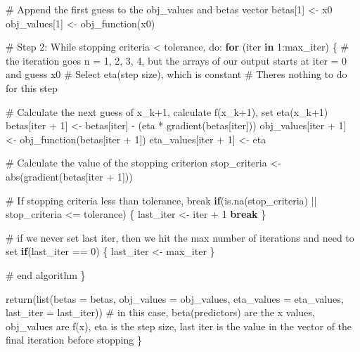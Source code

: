 \documentclass[
  letterpaper,
  DIV=11,
  numbers=noendperiod]{scrartcl}
\newenvironment{Shaded}{\begin{snugshade}}{\end{snugshade}}
\newcommand{\AttributeTok}[1]{\textcolor[rgb]{0.40,0.45,0.13}{#1}}
\newcommand{\CommentTok}[1]{\textcolor[rgb]{0.37,0.37,0.37}{#1}}
\newcommand{\ControlFlowTok}[1]{\textcolor[rgb]{0.00,0.23,0.31}{\textbf{#1}}}
\newcommand{\DecValTok}[1]{\textcolor[rgb]{0.68,0.00,0.00}{#1}}
\newcommand{\FunctionTok}[1]{\textcolor[rgb]{0.28,0.35,0.67}{#1}}
\newcommand{\NormalTok}[1]{\textcolor[rgb]{0.00,0.23,0.31}{#1}}
\newcommand{\OtherTok}[1]{\textcolor[rgb]{0.00,0.23,0.31}{#1}}
\newcommand{\SpecialCharTok}[1]{\textcolor[rgb]{0.37,0.37,0.37}{#1}}
\begin{document}
\begin{Shaded}
\begin{Highlighting}[]
  \CommentTok{\# Append the first guess to the obj\_values and betas vector}
\NormalTok{  betas[}\DecValTok{1}\NormalTok{] }\OtherTok{\textless{}{-}}\NormalTok{ x0}
\NormalTok{  obj\_values[}\DecValTok{1}\NormalTok{] }\OtherTok{\textless{}{-}} \FunctionTok{obj\_function}\NormalTok{(x0)}
  
  \CommentTok{\# Step 2: While stopping criteria \textless{} tolerance, do:}
  \ControlFlowTok{for}\NormalTok{ (iter }\ControlFlowTok{in} \DecValTok{1}\SpecialCharTok{:}\NormalTok{max\_iter) \{ }\CommentTok{\# the iteration goes n = 1, 2, 3, 4, but the arrays of our output starts at iter = 0 and guess x0}
    \CommentTok{\# Select eta(step size), which is constant}
    \CommentTok{\# There\textquotesingle{}s nothing to do for this step}
    
    \CommentTok{\# Calculate the next guess of x\_k+1, calculate f(x\_k+1), set eta(x\_k+1)}
\NormalTok{    betas[iter }\SpecialCharTok{+} \DecValTok{1}\NormalTok{] }\OtherTok{\textless{}{-}}\NormalTok{ betas[iter] }\SpecialCharTok{{-}}\NormalTok{ (eta }\SpecialCharTok{*} \FunctionTok{gradient}\NormalTok{(betas[iter]))}
\NormalTok{    obj\_values[iter }\SpecialCharTok{+} \DecValTok{1}\NormalTok{] }\OtherTok{\textless{}{-}} \FunctionTok{obj\_function}\NormalTok{(betas[iter }\SpecialCharTok{+} \DecValTok{1}\NormalTok{])}
\NormalTok{    eta\_values[iter }\SpecialCharTok{+} \DecValTok{1}\NormalTok{] }\OtherTok{\textless{}{-}}\NormalTok{ eta}
    
    \CommentTok{\# Calculate the value of the stopping criterion}
\NormalTok{    stop\_criteria }\OtherTok{\textless{}{-}} \FunctionTok{abs}\NormalTok{(}\FunctionTok{gradient}\NormalTok{(betas[iter }\SpecialCharTok{+} \DecValTok{1}\NormalTok{]))}
    
    \CommentTok{\# If stopping criteria less than tolerance, break}
    \ControlFlowTok{if}\NormalTok{(}\FunctionTok{is.na}\NormalTok{(stop\_criteria) }\SpecialCharTok{||}\NormalTok{ stop\_criteria }\SpecialCharTok{\textless{}=}\NormalTok{ tolerance) \{ }
\NormalTok{      last\_iter }\OtherTok{\textless{}{-}}\NormalTok{ iter }\SpecialCharTok{+} \DecValTok{1}
      \ControlFlowTok{break} 
\NormalTok{    \}}
    
    \CommentTok{\# if we never set last iter, then we hit the max number of iterations and need to set}
    \ControlFlowTok{if}\NormalTok{(last\_iter }\SpecialCharTok{==} \DecValTok{0}\NormalTok{) \{ last\_iter }\OtherTok{\textless{}{-}}\NormalTok{ max\_iter \}}
    
    \CommentTok{\# end algorithm}
\NormalTok{  \}}
  
  \FunctionTok{return}\NormalTok{(}\FunctionTok{list}\NormalTok{(}\AttributeTok{betas =}\NormalTok{ betas, }\AttributeTok{obj\_values =}\NormalTok{ obj\_values, }\AttributeTok{eta\_values =}\NormalTok{ eta\_values, }\AttributeTok{last\_iter =}\NormalTok{ last\_iter)) }\CommentTok{\# in this case, beta(predictors) are the x values, obj\_values are f(x), eta is the step size, last iter is the value in the vector of the final iteration before stopping}
\NormalTok{\}}
\end{Highlighting}
\end{Shaded}
\end{document}
